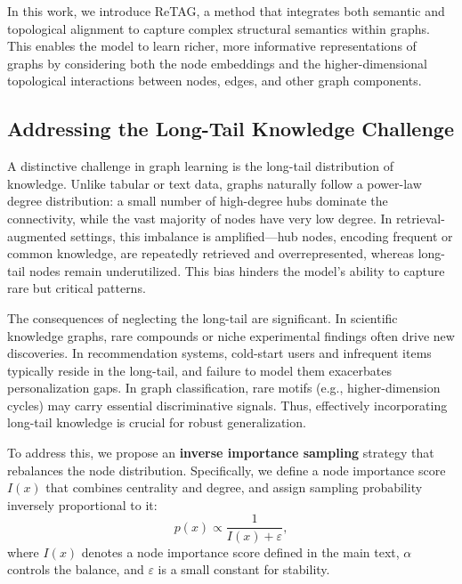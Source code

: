 In this work, we introduce ReTAG, a method that integrates both semantic and topological alignment to capture complex structural semantics within graphs. This enables the model to learn richer, more informative representations of graphs by considering both the node embeddings and the higher-dimensional topological interactions between nodes, edges, and other graph components.

\subsection{Addressing the Long-Tail Knowledge Challenge}

A distinctive challenge in graph learning is the long-tail distribution of knowledge. 
Unlike tabular or text data, graphs naturally follow a power-law degree distribution: a small number 
of high-degree hubs dominate the connectivity, while the vast majority of nodes have very low degree\citep{barabasi1999emergence,newman2003structure}. 
In retrieval-augmented settings, this imbalance is amplified---hub nodes, encoding frequent or common 
knowledge, are repeatedly retrieved and overrepresented, whereas long-tail nodes remain underutilized\citep{lewis2020retrieval,borgeaud2022improving}. 
This bias hinders the model’s ability to capture rare but critical patterns. 

The consequences of neglecting the long-tail are significant. In scientific knowledge graphs, 
rare compounds or niche experimental findings often drive new discoveries. In recommendation 
systems, cold-start users and infrequent items typically reside in the long-tail, and failure to model 
them exacerbates personalization gaps\citep{park2008long,celma2010music}. In graph classification, rare motifs (e.g., higher-dimension 
cycles) may carry essential discriminative signals. Thus, effectively incorporating long-tail knowledge 
is crucial for robust generalization.

To address this, we propose an \textbf{inverse importance sampling} strategy that rebalances the node 
distribution. Specifically, we define a node importance score $I(x)$ that combines centrality and degree, 
and assign sampling probability inversely proportional to it:
\begin{equation}
    p(x) \propto \frac{1}{I(x)+\varepsilon}, 
\end{equation}
where $I(x)$ denotes a node importance score defined in the main text, $\alpha$ controls the balance, 
and $\varepsilon$ is a small constant for stability. 

